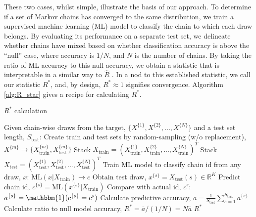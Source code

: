 \documentclass{article}
\begin{document}
These two cases, whilst simple, illustrate the basis of our approach. To determine if a set of Markov chains has converged to the same distribution, we train a supervised machine learning (ML) model to classify the chain to which each draw belongs. By evaluating its performance on a separate test set, we delineate whether chains have mixed based on whether classification accuracy is above the ``null'' case, where accuracy is $1/{N}$, and $N$ is the number of chains. By taking the ratio of ML accuracy to this null accuracy, we obtain a statistic that is interpretable in a similar way to $\widehat{R}$ \citep{vehtari2019rank}. In a nod to this established statistic, we call our statistic $R^*$, and, by design, $R^*\approx 1$ signifies convergence. Algorithm \ref{alg:R_star} gives a recipe for calculating $R^*$.

\begin{algorithm}[tb]
	\caption{$R^*$ calculation}
	\label{alg:R_star}
	\begin{algorithmic}
		\STATE Given chain-wise draws from the target, $\{X^{\{1\}},X^{\{2\}},...,X^{\{N\}}\}$ and a test set length, $S_\text{test}$:
		\STATE Create train and test sets by random-sampling (w/o replacement), $X^{\{m\}}\rightarrow\{X^{\{m\}}_\text{train},X^{\{m\}}_\text{test}\}$
		\ENDFOR
		\STATE Stack $X_\text{train} = (X^{\{1\}}_\text{train},X^{\{2\}}_\text{train},...,X^{\{N\}}_\text{train})^T$
		\STATE Stack $X_\text{test} = (X^{\{1\}}_\text{test},X^{\{2\}}_\text{test},...,X^{\{N\}}_\text{test})^T$
		\STATE Train ML model to classify chain id from any draw, $x$: $\text{ML}(x|X_\text{train}) \rightarrow c$
		\STATE Obtain test draw, $x^{\{s\}}=X_\text{test}(s)\in \mathbb{R}^K$
		\STATE Predict chain id, $c^{\{s\}} = \text{ML}(x^{\{s\}}|X_\text{train})$
		\STATE Compare with actual id, $c^s$: $a^{\{s\}}=\mathbbm{1}(c^{\{s\}}=c^s)$
		\ENDFOR
		\STATE Calculate predictive accuracy, $\bar{a} = \frac{1}{S_\text{test}} \sum_{s=1}^{S_\text{test}} a^{\{s\}}$
		\STATE Calculate ratio to null model accuracy, $R^* = \bar{a} / (1 / N) = N \bar{a}$
		\RETURN $R^*$
	\end{algorithmic}
\end{algorithm}
\end{document}
